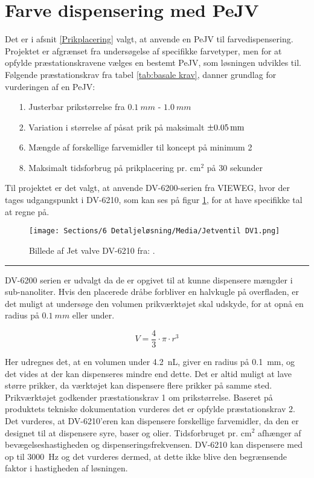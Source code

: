 \section{Farve dispensering med PeJV} \label{farvedispensering med PeJV}

Det er i afsnit \ref{Prikplacering} valgt, at anvende en PeJV til farvedispensering. Projektet er afgrænset fra undersøgelse af specifikke farvetyper, men for at opfylde præstationskravene vælges en bestemt PeJV, som løsningen udvikles til. Følgende præstationskrav fra tabel \ref{tab:basale krav}, danner grundlag for vurderingen af en PeJV:
\begin{itemize}
    \item[1.] Justerbar prikstørrelse fra \(\SI{0,1}{mm}\) - \(\SI{1,0}{mm}\)
    \item[2.] Variation i størrelse af påsat prik på maksimalt $\SI{\pm0,05}{mm}$ 
    \item[6.] Mængde af forskellige farvemidler til koncept på minimum 2
    \item[8.] Maksimalt tidsforbrug på prikplacering pr. cm\(^2\) på 30 sekunder
\end{itemize}

Til projektet er det valgt, at anvende DV-6200-serien fra VIEWEG, hvor der tages udgangspunkt i DV-6210, som kan ses på figur \ref{fig:Jetventil}, for at have specifikke tal at regne på.

\begin{figure}[H]
    \centering
    \texttt{[image: Sections/6 Detaljeløsning/Media/Jetventil DV1.png]}
    \caption{Billede af Jet valve DV-6210 fra: \parencite{VIEWEG2025JetDV-6210}.}
    \label{fig:Jetventil}
\end{figure}
\plainbreak{-0.5}

DV-6200 serien er udvalgt da de er opgivet til at kunne dispensere mængder i sub-nanoliter. Hvis den placerede dråbe forbliver en halvkugle på overfladen, er det muligt at undersøge den volumen prikværktøjet skal udskyde, for at opnå en radius på $\SI{0,1}{mm}$ eller under. \parencite{VIEWEG2025JetDV-6210}

\begin{equation}
    V=\dfrac{4}{3}\cdot \pi\cdot r^3
\end{equation}

Her udregnes det, at en volumen under \SI{4,2}{nL}, giver en radius på \SI{0,1}{mm}, og det vides at der kan dispenseres mindre end dette. Det er altid muligt at lave større prikker, da værktøjet kan dispensere flere prikker på samme sted. Prikværktøjet godkender præstationskrav 1 om prikstørrelse. Baseret på produktets tekniske dokumentation vurderes det er opfylde præstationskrav 2. Det vurderes, at DV-6210'eren kan dispensere forskellige farvemidler, da den er designet til at dispensere syre, baser og olier. Tidsforbruget pr. cm\(^2\) afhænger af bevægelseshastigheden og dispenseringsfrekvensen. DV-6210 kan dispensere med op til \SI{3000}{Hz} og det vurderes dermed, at dette ikke blive den begrænsende faktor i hastigheden af løsningen.


